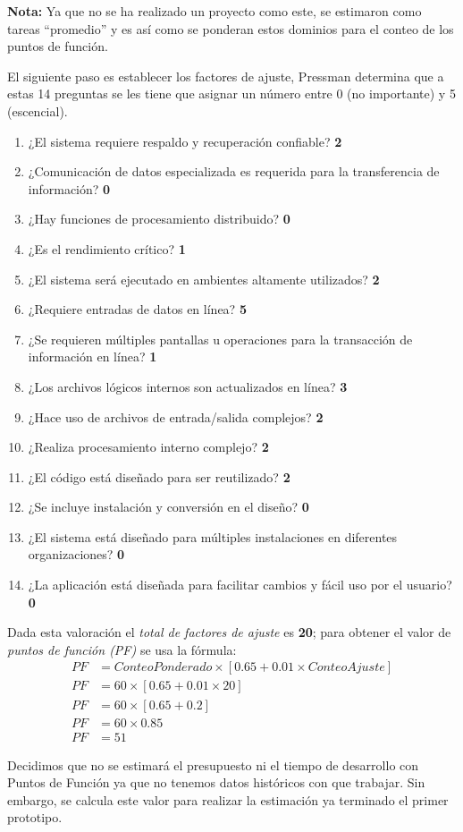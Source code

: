 \documentclass[letterpaper]{article}
\begin{document}
\textbf{Nota:} Ya que no se ha realizado un proyecto como este, se estimaron como tareas ``promedio'' y es así como se ponderan estos dominios para el conteo de los puntos de función.

El siguiente paso es establecer los factores de ajuste, Pressman determina que a estas 14 preguntas se les tiene que asignar un número entre 0 (no importante) y 5 (escencial).

\begin{enumerate}
\item ¿El sistema requiere respaldo y recuperación confiable? \textbf{2}
\item ¿Comunicación de datos especializada es requerida para la transferencia de información? \textbf{0}
\item ¿Hay funciones de procesamiento distribuido? \textbf{0}
\item ¿Es el rendimiento crítico? \textbf{1}
\item ¿El sistema será ejecutado en ambientes altamente utilizados? \textbf{2}
\item ¿Requiere entradas de datos en línea? \textbf{5}
\item ¿Se requieren múltiples pantallas u operaciones para la transacción de información en línea? \textbf{1}
\item ¿Los archivos lógicos internos son actualizados en línea? \textbf{3}
\item ¿Hace uso de archivos de entrada/salida complejos? \textbf{2}
\item ¿Realiza procesamiento interno complejo? \textbf{2}
\item ¿El código está diseñado para ser reutilizado? \textbf{2}
\item ¿Se incluye instalación y conversión en el diseño? \textbf{0}
\item ¿El sistema está diseñado para múltiples instalaciones en diferentes organizaciones? \textbf{0}
\item ¿La aplicación está diseñada para facilitar cambios y fácil uso por el usuario? \textbf{0}
\end{enumerate}

Dada esta valoración el \emph{total de factores de ajuste} es \textbf{20}; para obtener el valor de \emph{puntos de función (PF)} se usa la fórmula:
\begin{align*}
  PF &= ConteoPonderado \times [0.65+0.01 \times ConteoAjuste] \\
  PF &= 60 \times [0.65 + 0.01 \times 20] \\
  PF &= 60 \times [0.65 + 0.2] \\
  PF &= 60 \times 0.85 \\
  PF &= 51
\end{align*}

Decidimos que no se estimará el presupuesto ni el tiempo de desarrollo con Puntos de Función ya que no tenemos datos históricos con que trabajar. Sin embargo, se calcula este valor para realizar la estimación ya terminado el primer prototipo.
\end{document}
